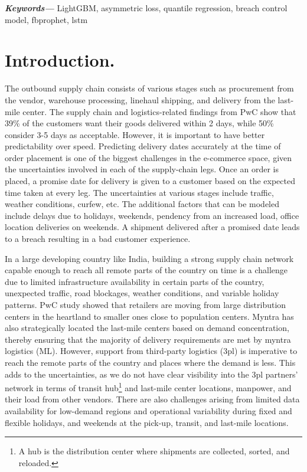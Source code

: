 \documentclass[twoside,leqno,twocolumn]{article}
\providecommand{\keywords}[1]
{
  \textbf{\textit{Keywords---}} #1
}
\begin{document}
\keywords{LightGBM, asymmetric loss, quantile regression, breach control model, fbprophet, lstm}

\section{Introduction.}

The outbound supply chain consists of various stages such as procurement from the vendor, warehouse processing, linehaul shipping, and delivery from the last-mile center. The supply chain and logistics-related findings from PwC\cite{RefWorks:1} show that 39\% of the customers want their goods delivered within 2 days, while 50\% consider 3-5 days as acceptable. However, it is important to have better predictability over speed\cite{RefWorks:1}. Predicting delivery dates accurately at the time of order placement is one of the biggest challenges in the e-commerce space, given the uncertainties involved in each of the supply-chain legs. Once an order is placed, a promise date for delivery is given to a customer based on the expected time taken at every leg. The uncertainties at various stages include traffic, weather conditions, curfew, etc. The additional factors that can be modeled include delays due to holidays, weekends, pendency from an increased load, office location deliveries on weekends. A shipment delivered after a promised date leads to a breach resulting in a bad customer experience. 

In a large developing country like India, building a strong supply chain network capable enough to reach all remote parts of the country on time is a challenge due to limited infrastructure availability in certain parts of the country, unexpected traffic, road blockages, weather conditions, and variable holiday patterns. PwC study showed that retailers are moving from large distribution centers in the heartland to smaller ones close to population centers\cite{RefWorks:1}. Myntra has also strategically located the last-mile centers based on demand concentration, thereby ensuring that the majority of delivery requirements are met by myntra logistics (ML). However, support from third-party logistics (3pl) is imperative to reach the remote parts of the country and places where the demand is less. This adds to the uncertainties, as we do not have clear visibility into the 3pl partners' network in terms of transit hub\footnote{A hub is the distribution center where shipments are collected, sorted, and reloaded.} and last-mile center locations, manpower, and their load from other vendors. There are also challenges arising from limited data availability for low-demand regions and operational variability during fixed and flexible holidays, and weekends at the pick-up, transit, and last-mile locations.
 
\end{document}
